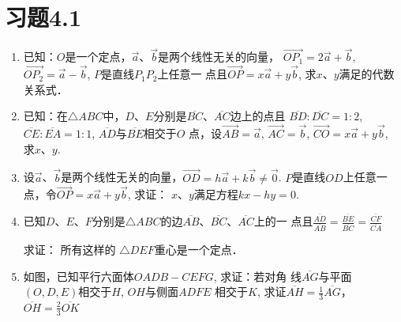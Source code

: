 \section*{习题4.1}

\begin{enumerate}
    \item 已知：$O$是一个定点，$\vec{a}$、$\vec{b}$是两个线性无关的向量，
$\Vec{OP_1}=2\vec{a}+\vec{b}$, $\Vec{OP_2}=\vec{a}-\vec{b}$, $P$是直线$P_1P_2$上任意一
    点且$\Vec{OP}=x\vec{a}+y\vec{b}$, 求$x$、$y$满足的代数关系式．
    \item 已知：在$\triangle ABC$中，$D$、$E$分别是$\overline{BC}$、$\overline{AC}$边上的点且
    $\overline{BD}:\overline{DC}=1:2$, $\overline{CE}:\overline{EA}=1:1$, $\overline{AD}$与$\overline{BE}$相交于$O$
    点，设$\Vec{AB}=\vec{a}$, $\Vec{AC}=\vec{b}$, $\Vec{CO}=x\vec{a}+y\vec{b}$, 求$x$、$y$.
    \item 设$\vec{a}$、$\vec{b}$是两个线性无关的向量，$\Vec{OD}=h\vec{a}+k\vec{b}\ne \vec{0}$.
    $P$是直线$OD$上任意一点，令$\Vec{OP}=x\vec{a}+y\vec{b}$, 求证：
    $x$、$y$满足方程$kx-hy=0$.
    \item 已知$D$、$E$、$F$分别是$\triangle ABC$的边$\overline{AB}$、$\overline{BC}$、$\overline{AC}$上的一
    点且$\frac{\overline{AD}}{\overline{AB}}=\frac{\overline{BE}}{\overline{BC}}=\frac{\overline{CF}}{\overline{CA}}$

    求证：
    所有这样的
    $\triangle DEF$重心是一个定点．

\item 如图，已知平行六面体$OADB-CEFG$, 求证：若对角
线$\overline{AG}$与平面$(O,D,E)$相交于$H$, $OH$与侧面$ADFE$
相交于$K$, 求证$\overline{AH}=\frac{1}{3}\overline{AG}$，$\overline{OH}=\frac{2}{3}\overline{OK}$

\begin{figure}[htp]\centering
    \begin{minipage}[t]{0.48\textwidth}
    \centering
{}
\end{minipage}
\end{figure}
\end{enumerate}

